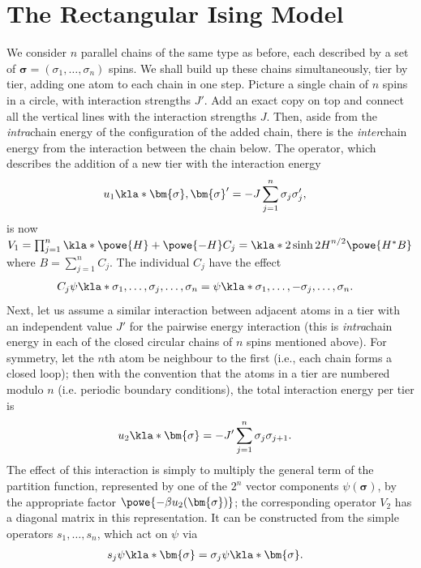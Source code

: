 \documentclass[english, parskip=full]{scrartcl}
\newcommand{\note}[1]{\bgroup\color{black!30!blue}#1\egroup}
\newcommand{\comment}[1]{\bgroup\color{black!30!blue}#1 \egroup}
\begin{document}
\section{The Rectangular Ising Model}
We consider $n$ parallel chains of the same type as before, each described by a set of $\bm{\sigma} = (\sigma_1, \dots, \sigma_n)$ spins.
We shall build up these chains simultaneously, tier by tier, adding one atom to each chain in one step.
\comment{Picture a single chain of $n$ spins in a circle, with interaction strengths $J'$.
Add an exact copy on top and connect all the vertical lines with the interaction strengths $J$.
Then, aside from the \emph{intra}chain energy of the configuration of the added chain, there is the \emph{inter}chain energy from the interaction between the chain below.}
The operator, which describes the addition of a new tier with the interaction energy
\begin{align}
u_1\kla*{\bm{\sigma}, \bm{\sigma}'} &= - J\sum_{j=1}^n \sigma_j\sigma_j',
\end{align}
is now $V_1 = \prod_{j=1}^n \kla*{\powe{H} + \powe{-H}C_j} = \kla*{2\sinh 2H}^{n/2} \powe{H^\ast B}$ where $B=\sum_{j=1}^n C_j$.
The individual $C_j$ have the effect
\begin{align}
C_j \psi\kla*{\sigma_1, \dots, \sigma_j, \dots, \sigma_n} &= \psi\kla*{\sigma_1, \dots, -\sigma_j, \dots, \sigma_n}.
\end{align}
Next, let us assume a similar interaction between adjacent atoms in a tier with an independent value $J'$ for the pairwise energy interaction \note{(this is \emph{intra}chain energy in each of the closed circular chains of $n$ spins mentioned above)}.
For symmetry, let the $n$th atom be neighbour to the first \note{(i.e., each chain forms a closed loop)}; then with the convention that the atoms in a tier are numbered modulo $n$ \note{(i.e. periodic boundary conditions)}, the total interaction energy per tier is
\begin{align}
u_2\kla*{\bm{\sigma}} &= -J' \sum_{j=1}^n \sigma_j\sigma_{j+1}.
\end{align}
The effect of this interaction is simply to multiply the general term of the partition function, represented by one of the $2^n$ vector components $\psi(\bm{\sigma})$, by the appropriate factor $\powe{-\beta u_2(\bm{\sigma})}$; the corresponding operator $V_2$ has a diagonal matrix in this representation.
It can be constructed from the simple operators $s_1,\dots,s_n$, which act on $\psi$ via
\begin{align}
s_j \psi\kla*{\bm{\sigma}} &= \sigma_j \psi\kla*{\bm{\sigma}}.
\end{align}
\end{document}
